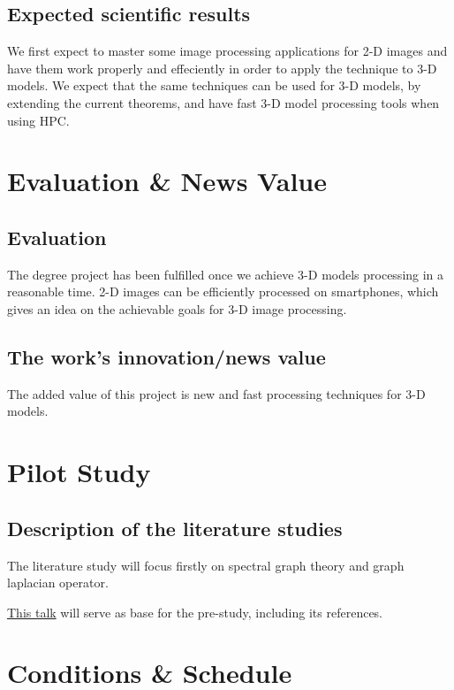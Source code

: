 \documentclass[12pt]{article}
\begin{document}
\subsection*{Expected scientific results}

We first expect to master some image processing applications for 2-D images and have them work properly and effeciently in order to apply the technique to 3-D models.
We expect that the same techniques can be used for 3-D models, by extending the current theorems, and have fast 3-D model processing tools when using HPC.

\section*{Evaluation \& News Value}

\subsection*{Evaluation}

The degree project has been fulfilled once we achieve 3-D models processing in a reasonable time.
2-D images can be efficiently processed on smartphones, which gives an idea on the achievable goals for 3-D image processing.

\subsection*{The work's innovation/news value}

The added value of this project is new and fast processing techniques for 3-D models.

\section*{Pilot Study}

\subsection*{Description of the literature studies}

The literature study will focus firstly on spectral graph theory and graph laplacian operator.

\href{https://www.pathlms.com/siam/courses/2426/sections/3234}{This talk} will serve as base for the pre-study, including its references.

\section*{Conditions \& Schedule}
\end{document}
